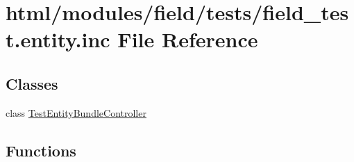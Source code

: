 \hypertarget{field__test_8entity_8inc}{
\section{html/modules/field/tests/field\_\-test.entity.inc File Reference}
\label{field__test_8entity_8inc}
}
\subsection*{Classes}
\begin{DoxyCompactItemize}
\item 
class \hyperlink{classTestEntityBundleController}{TestEntityBundleController}
\end{DoxyCompactItemize}
\subsection*{Functions}
